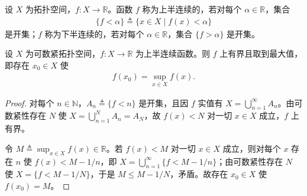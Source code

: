 \documentclass[../main.tex]{subfiles}
\begin{document}
\begin{definition}[上、下半连续]\label{definition:appA-半连续}
设 $X$ 为拓扑空间，$f:X\to\mathbb{R}$。函数 $f$ 称为上半连续的，若对每个 $\alpha\in\mathbb{R}$，集合
\begin{align*}
\{f<\alpha\}\triangleq\{x\in X\mid f(x)<\alpha\}
\end{align*}
是开集；$f$ 称为下半连续的，若对每个 $\alpha\in\mathbb{R}$，集合 $\{f>\alpha\}$ 是开集。
\end{definition}

\begin{proposition}\label{proposition:appA-上半连续最大值}
设 $X$ 为可数紧拓扑空间，$f:X\to\mathbb{R}$ 为上半连续函数。则 $f$ 上有界且取到最大值，即存在 $x_0\in X$ 使
\begin{align*}
f(x_0)=\sup_{x\in X}f(x).
\end{align*}
\end{proposition}

\begin{proof}
对每个 $n\in\mathbb{N}$，$A_n\triangleq\{f<n\}$ 是开集，且因 $f$ 实值有 $X=\bigcup_{n=1}^\infty A_n$。由可数紧性存在 $N$ 使 $X=\bigcup_{n=1}^NA_n=A_N$，故 $f(x)<N$ 对一切 $x\in X$ 成立，$f$ 上有界。

令 $M\triangleq\sup_{x\in X}f(x)\in\mathbb{R}$。若 $f(x)<M$ 对一切 $x\in X$ 成立，则对每个 $x$ 存在 $n$ 使 $f(x)<M-1/n$，即 $X=\bigcup_{n=1}^\infty\{f<M-1/n\}$；由可数紧性存在 $N$ 使 $X=\{f<M-1/N\}$，于是 $M\leqslant M-1/N$，矛盾。故存在 $x_0\in X$ 使 $f(x_0)=M$。
\end{proof}
\end{document}
